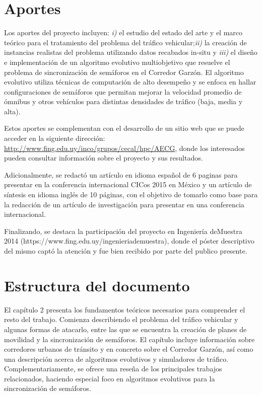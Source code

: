 \section{Aportes}
Los aportes del proyecto incluyen: \textit{i)} el estudio del estado del arte y el marco teórico para el tratamiento del problema del tráfico vehicular;\textit{ii)} la creación de instancias realistas del problema utilizando datos recabados in-situ y \textit{iii)} el diseño e implementación de un algoritmo evolutivo multiobjetivo que resuelve el problema de sincronización de semáforos en el Corredor Garzón. El algoritmo evolutivo utiliza técnicas de computación de alto desempeño y se enfoca en hallar configuraciones de semáforos que permitan mejorar la velocidad promedio de ómnibus y otros vehículos para distintas densidades de tráfico (baja, media y alta). 

Estos aportes se complementan con el desarrollo de un sitio web que se puede acceder en la siguiente dirección: \url{http://www.fing.edu.uy/inco/grupos/cecal/hpc/AECG}, donde los interesados pueden consultar información sobre el proyecto y sus resultados. 

Adicionalmente, se redactó un artículo en idioma español de 6 paginas para presentar en la conferencia internacional CICos 2015 en México y un artículo de síntesis en idioma inglés de 10 páginas, con el objetivo de tomarlo como base para la redacción de un artículo de investigación para presentar en una conferencia internacional. 

Finalizando, se destaca la participación del proyecto en Ingeniería deMuestra 2014 (https://www.fing.edu.uy/ingenieriademuestra), donde el póster descriptivo del mismo captó la atención y fue bien recibido por parte del publico presente.



\section{Estructura del documento}
El capítulo 2 presenta los fundamentos teóricos necesarios para comprender el resto del trabajo. Comienza describiendo el problema del tráfico vehicular y algunas formas de atacarlo, entre las que se encuentra la creación de planes de movilidad y la sincronización de semáforos. El capítulo incluye información sobre corredores urbanos de tránsito y en concreto sobre el Corredor Garzón, así como una descripción acerca de algoritmos evolutivos y simuladores de tráfico. Complementariamente, se ofrece una reseña de los principales trabajos relacionados, haciendo especial foco en algoritmos evolutivos para la sincronización de semáforos.


